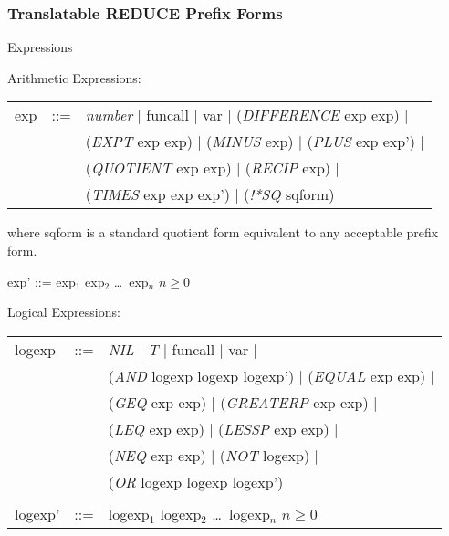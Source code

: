 \subsubsection{Translatable REDUCE Prefix Forms}
\begin{describe}{Expressions}

Arithmetic Expressions:

\begin{tabular}{lll}
exp & ::= & {\it number\/} $\mid$  funcall  $\mid$  var  $\mid$ 
({\it DIFFERENCE\/} exp exp) $\mid$\\
& &({\it EXPT\/} exp exp)  $\mid$  ({\it MINUS\/} exp)  $\mid$  ({\it PLUS\/}
 exp exp') $\mid$\\
& & ({\it QUOTIENT\/} exp exp)  $\mid$  ({\it RECIP\/} exp) $\mid$\\
& & ({\it TIMES\/} exp exp exp')  $\mid$  ({\it !*SQ\/} sqform)\\
\end{tabular}

where sqform is a standard quotient form equivalent to any acceptable prefix
form.

exp' ::=  exp$_1$ exp$_2$ \dots\  exp$_n$  $n \geq 0$

Logical Expressions:

\begin{tabular}{lll}
logexp & ::= & {\it NIL\/} $\mid$ {\it T\/} $\mid$  funcall  $\mid$  var
$\mid$\\
& &  ({\it AND\/} logexp logexp logexp')  $\mid$  ({\it EQUAL\/} exp exp)
$\mid$\\
& & ({\it GEQ\/} exp exp)  $\mid$  ({\it GREATERP\/} exp exp)  $\mid$ \\
& & ({\it LEQ\/} exp exp) $\mid$ ({\it LESSP\/} exp exp)  $\mid$ \\
& & ({\it NEQ\/} exp exp) $\mid$ ({\it NOT\/} logexp) $\mid$ \\
& & ({\it OR\/} logexp logexp logexp')\\
& &\\
logexp' & ::= & logexp$_1$ logexp$_2$ \dots\  logexp$_n$  $n \geq 0$\\
\end{tabular}
\end{describe}

